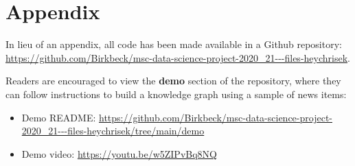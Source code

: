 \documentclass[11pt]{article}
\begin{document}
\newpage

\section{Appendix}

In lieu of an appendix, all code has been made available in a Github repository: \url{https://github.com/Birkbeck/msc-data-science-project-2020_21---files-heychrisek}.

Readers are encouraged to view the \textbf{demo} section of the repository, where they can follow instructions to build a knowledge graph using a sample of news items:
\begin{itemize}
  \item{Demo README: \url{https://github.com/Birkbeck/msc-data-science-project-2020_21---files-heychrisek/tree/main/demo}}
  \item{Demo video: \url{https://youtu.be/w5ZIPvBq8NQ}}
\end{itemize}

\newpage



\end{document}
